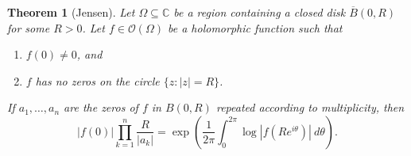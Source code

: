 \documentclass[11pt]{article}
\theoremstyle{thmstyle}
\newtheorem{theorem}{Theorem}[section]
\theoremstyle{defstyle}
\newcommand{\bbC}{\mathbb{C}}
\newcommand{\scrO}{\mathscr{O}} %
\begin{document}
\begin{theorem}[Jensen]
    Let $\Omega\subseteq\bbC$ be a region containing a closed disk $\overline B(0, R)$ for some $R > 0$. Let $f\in\scrO(\Omega)$ be a holomorphic function such that 
    \begin{enumerate}[label=(\roman*)]
        \item $f(0)\ne 0$, and 
        \item $f$ has no zeros on the circle $\{z\colon |z| = R\}$.
    \end{enumerate}
    If $a_1,\dots, a_n$ are the zeros of $f$ in $B(0, R)$ repeated according to multiplicity, then 
    \begin{equation*}
        |f(0)|\prod_{k = 1}^n\frac{R}{|a_k|} = \exp\left(\frac{1}{2\pi}\int_0^{2\pi}\log|f(Re^{i\theta})|~d\theta\right).
    \end{equation*}
\end{theorem}
\end{document}

